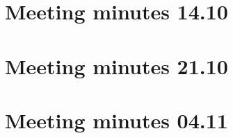 \section{Meeting minutes 14.10}
\label{app:customer-minutes-8}


\section{Meeting minutes 21.10}
\label{app:customer-minutes-9}


\section{Meeting minutes 04.11}
\label{app:customer-minutes-10}

